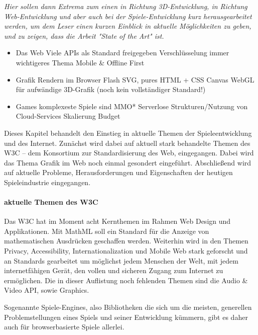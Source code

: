 \emph{Hier sollen dann Extrema zum einen in Richtung 3D-Entwicklung, in Richtung Web-Entwicklung und aber auch bei der Spiele-Entwicklung kurz herausgearbeitet werden, um dem Leser einen kurzen Einblick in aktuelle Möglichkeiten zu geben, und zu zeigen, dass die Arbeit "State of the Art" ist.}
\begin{itemize}
	\item Das Web
		\subitem Viele APIs als Standard freigegeben
		\subitem Verschlüsselung immer wichtigeres Thema
		\subitem Mobile \& Offline First
		\subitem 
	\item Grafik Rendern im Browser
		\subitem Flash
		\subitem SVG, pures HTML + CSS
		\subitem Canvas
		\subitem WebGL für aufwändige 3D-Grafik (noch kein vollständiger Standard!)
	\item Games
		\subitem komplexeste Spiele sind MMO*
		\subitem Serverlose Strukturen/Nutzung von Cloud-Services
		\subitem Skalierung
		\subitem Budget
\end{itemize}

Dieses Kapitel behandelt den Einstieg in aktuelle Themen der Spieleentwicklung und des Internet. Zunächst wird dabei auf aktuell stark behandelte Themen des W3C -- dem Konsortium zur Standardisierung des Web, eingegangen. Dabei wird das Thema Grafik im Web noch einmal gesondert eingeführt. Abschließend wird auf aktuelle Probleme, Herausforderungen und Eigenschaften der heutigen Spieleindustrie eingegangen.

\paragraph{aktuelle Themen des W3C}
Das W3C hat im Moment acht Kernthemen im Rahmen Web Design und Applikationen.
Mit MathML soll ein Standard für die Anzeige von mathematischen Ausdrücken geschaffen werden. Weiterhin wird in den Themen Privacy, Accessibility, Internationalization und Mobile Web stark geforscht und an Standards gearbeitet um möglichst jedem Menschen der Welt, mit jedem internetfähigen Gerät, den vollen und sicheren Zugang zum Internet zu ermöglichen. Die in dieser Auflistung noch fehlenden Themen sind die Audio \& Video API, sowie Graphics.

Sogenannte Spiele-Engines, also Bibliotheken die sich um die meisten, generellen Problemstellungen eines Spiels und seiner Entwicklung kümmern, gibt es daher auch für browserbasierte Spiele allerlei.


